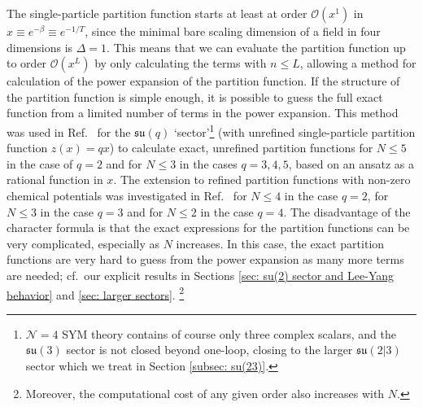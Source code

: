 \documentclass[a4paper,11pt]{article}
\begin{document}
The single-particle partition function starts at least at order $\mathcal{O}(x^1)$ in $x\equiv e^{-\beta}\equiv e^{-1/T}$, since the minimal bare scaling dimension of a field in four dimensions is $\Delta=1$. 
This means that we can evaluate the partition function up to order $\mathcal{O}(x^L)$ by only calculating the terms with $n\leq L$, allowing a method for calculation of the power expansion of the partition function. If the structure of the partition function is simple enough, it is possible to guess the full exact function from a limited number of terms in the power expansion.
This method was used in Ref.\ \cite{Harmark:2014mpa} for the $\mathfrak{su}(q)$ `sector'\footnote{%
$\mathcal{N}=4$ SYM theory contains of course only three complex scalars, and the $\mathfrak{su}(3)$ sector is not closed beyond one-loop, closing to the larger $\mathfrak{su}(2|3)$ sector which we treat in Section \ref{subsec: su(23)}.
} (with unrefined single-particle partition function $z(x)=q x$) to calculate exact, unrefined partition functions for $N\leq 5$ in the case of $q=2$ and for $N\leq 3$ in the cases $q=3,4,5$, based on an ansatz as a rational function in $x$.
The extension to refined partition functions with non-zero chemical potentials was investigated in Ref.\ \cite{Vardinghus:2015} for $N\leq 4$ in the case $q=2$, for $N\leq3$ in the case $q=3$ and for $N\leq2$ in the case $q=4$. 
The disadvantage of the character formula is that the exact expressions for the partition functions can be very complicated, especially as $N$ increases. In this case, the exact partition functions are very hard to guess from the power expansion as many more terms are needed; cf.\ our explicit results in Sections \ref{sec: su(2) sector and Lee-Yang behavior} and \ref{sec: larger sectors}.%
\footnote{Moreover, the computational cost of any given order also increases with $N$.}
\end{document}
